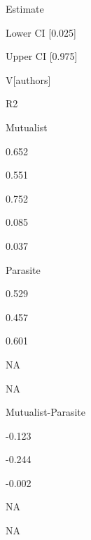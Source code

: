 \documentclass[
]{article}
\begin{document}
Estimate

Lower CI {[}0.025{]}

Upper CI {[}0.975{]}

V{[}authors{]}

R2

Mutualist

0.652

0.551

0.752

0.085

0.037

Parasite

0.529

0.457

0.601

NA

NA

Mutualist-Parasite

-0.123

-0.244

-0.002

NA

NA
\end{document}
